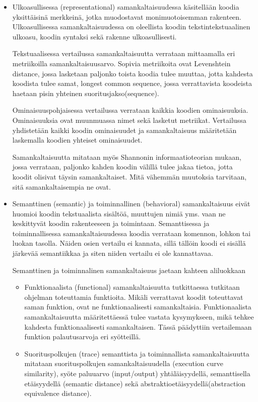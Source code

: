 \documentclass[finnish]{tktltiki2}
\theoremstyle{definition}
\theoremstyle{remark}
\begin{document}
\begin{itemize}
\item{Ulkoasullisessa (representational)}
samankaltaisuudessa käsitellään koodia yksittäisinä merkkeinä, jotka muodostavat monimuotoisemman rakenteen. Ulkoasullisessa samankaltaisuudessa on oleellista koodin tekstintekstuaalinen ulkoasu, koodin syntaksi sekä rakenne ulkoasullisesti. %

Tekstuaalisessa vertailussa samankaltaisuutta verrataan mittaamalla eri metriikoilla samankaltaisuusarvo. Sopivia metriikoita ovat Levenshtein distance, jossa lasketaan paljonko toista koodia tulee muuttaa, jotta kahdesta koodista tulee samat, longest common sequence, jossa verrattavista koodeista haetaan pisin yhteinen suoritusjakso(sequence).

Ominaisuuspohjaisessa vertailussa verrataan kaikkia koodien ominaisuuksia. Ominaisuuksia ovat muunmuassa nimet sekä lasketut metriikat. Vertailussa yhdistetään kaikki koodin ominaisuudet ja samankaltaisuus määritetään laskemalla koodien yhteiset ominaisuudet.

Samankaltaisuutta mitataan myös Shannonin informaatioteorian mukaan, jossa verrataan, paljonko kahden koodin välillä tulee jakaa tietoa, jotta koodit olisivat täysin samankaltaiset. Mitä vähemmän muutoksia tarvitaan, sitä samankaltaisempia ne ovat.

\item{Semanttinen (semantic) ja toiminnallinen (behavioral) }
samankaltaisuus eivät huomioi koodin tekstuaalista sisältöä, muuttujen nimiä yms. vaan ne keskittyvät koodin rakenteeseen ja toimintaan.
Semanttisessa ja toiminnallisessa samankaltaisuudessa koodia verrataan komennon, lohkon tai luokan tasolla. Näiden osien vertailu ei kannata, sillä tällöin koodi ei sisällä järkevää semantiikkaa ja siten niiden vertailu ei ole kannattavaa.

Semanttinen ja toiminnalinen samankaltaisuus jaetaan kahteen aliluokkaan
\begin{itemize}
\item{Funktionaalista (functional) samankaltaisuutta} tutkittaessa tutkitaan ohjelman toteuttamia funktioita. Mikäli verrattavat koodit toteuttavat saman funktion, ovat ne funktionaalisesti samankaltaisia. Funktionaalista samankaltaisuutta määritettäessä tulee vastata kysymykseen, mikä tehkee kahdesta funktionaalisesti samankaltaisen. Tässä päädyttiin vertailemaan funktion palautusarvoja eri syötteillä.

\item{Suorituspolkujen (trace) } semanttista ja toiminnallista samankaltaisuutta mitataan suorituspolkujen samankaltaisuudella (execution curve similarity), syöte paluuarvo (input/output) yhtäläisyydellä, semanttisella etäisyydellä (semantic distance) sekä abstraktioetäisyydellä(abstraction equivalence distance).


\end{itemize}
\end{itemize}
\end{document}
